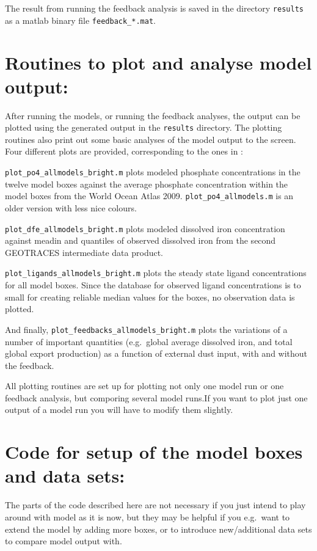 \documentclass[a4paper,titlepage=false]{scrartcl}
\begin{document}
The result from running the feedback analysis is saved in the
directory \verb+results+ as a matlab binary file
\verb+feedback_*.mat+.

\section{Routines to plot and analyse model output:}

After running the models, or running the feedback analyses, the output
can be plotted using the generated output in the \verb+results+
directory. The plotting routines also print out some basic analyses of
the model output to the screen. Four different plots are provided,
corresponding to the ones in \citet{Voelker21}:

\verb+plot_po4_allmodels_bright.m+ plots modeled phosphate
concentrations in the twelve model boxes against the average phosphate
concentration within the model boxes from the World Ocean Atlas
2009. \verb+plot_po4_allmodels.m+ is an older version with less nice
colours.

\verb+plot_dfe_allmodels_bright.m+ plots modeled dissolved iron
concentration against meadin and quantiles of observed dissolved iron
from the second GEOTRACES intermediate data product.

\verb+plot_ligands_allmodels_bright.m+ plots the steady state ligand
concentrations for all model boxes. Since the database for observed
ligand concentrations is to small for creating reliable median values
for the boxes, no observation data is plotted.

And finally, \verb+plot_feedbacks_allmodels_bright.m+ plots the
variations of a number of important quantities (e.g.\ global average
dissolved iron, and total global export production) as a function of
external dust input, with and without the feedback.

All plotting routines are set up for plotting not only one model run
or one feedback analysis, but comporing several model runs.If you want
to plot just one output of a model run you will have to modify them
slightly.

\section{Code for setup of the model boxes and data sets:}

The parts of the code described here are not necessary if you just
intend to play around with model as it is now, but they may be helpful
if you e.g.\ want to extend the model by adding more boxes, or to
introduce new/additional data sets to compare model output with.
\end{document}
